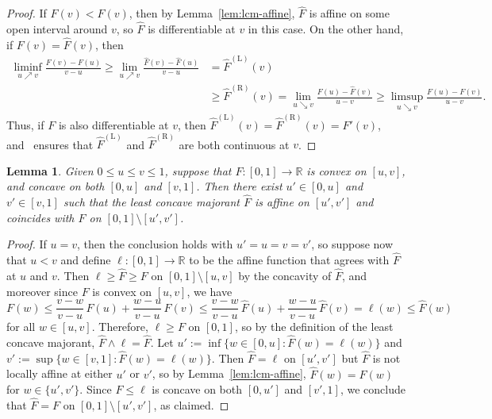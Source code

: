 \documentclass[a4paper]{article}
\newcommand{\R}{\mathbb{R}}
\newtheorem{lemma}[theorem]{Lemma}
\theoremstyle{definition}
\begin{document}
\begin{proof}
If $F(v) < \hat{F}(v)$, then by Lemma~\ref{lem:lcm-affine}, $\hat{F}$ is affine on some open interval around $v$, so $\hat{F}$ is differentiable at $v$ in this case. On the other hand, if $F(v) = \hat{F}(v)$, then
\begin{align*}
\liminf_{u \nearrow v}\frac{F(v) - F(u)}{v - u} \geq \lim_{u \nearrow v}\frac{\hat{F}(v) - \hat{F}(u)}{v - u} &= \hat{F}^{(\mathrm{L})}(v) \\
&\geq \hat{F}^{(\mathrm{R})}(v) = \lim_{u \searrow v}\frac{\hat{F}(u) - \hat{F}(v)}{u - v} \geq \limsup_{u \searrow v}\frac{F(u) - F(v)}{u - v}.
\end{align*}
Thus, if $F$ is also differentiable at $v$, then $\hat{F}^{(\mathrm{L})}(v) = \hat{F}^{(\mathrm{R})}(v) = F'(v)$, and~\citet[Theorem~24.1]{rockafellar97convex} ensures that $\hat{F}^{(\mathrm{L})}$ and $\hat{F}^{(\mathrm{R})}$ are both continuous at $v$.
\end{proof}

\begin{lemma}
\label{lem:lcm-concave-cvx}
Given $0 \leq u \leq v \leq 1$, suppose that $F \colon [0,1] \to \R$ is convex on $[u,v]$, and concave on both $[0,u]$ and $[v,1]$. Then there exist $u' \in [0,u]$ and $v' \in [v,1]$ such that the least concave majorant $\hat{F}$ is affine on $[u',v']$ and coincides with $F$ on $[0,1] \setminus [u',v']$.
\end{lemma}

\begin{proof}
If $u = v$, then the conclusion holds with $u' = u = v = v'$, so suppose now that $u < v$ and define $\ell \colon [0,1] \to \R$ to be the affine function that agrees with $\hat{F}$ at $u$ and $v$. Then 
$\ell \geq \hat{F} \geq F$ on $[0,1] \setminus [u,v]$ by the concavity of $\hat{F}$, and moreover since $F$ is convex on $[u,v]$, we have
\[
F(w) \leq \frac{v - w}{v - u}\,F(u) + \frac{w - u}{v - u}\,F(v) \leq \frac{v - w}{v - u}\,\hat{F}(u) + \frac{w - u}{v - u}\,\hat{F}(v) = \ell(w) \leq \hat{F}(w)
\]
for all $w \in [u,v]$. Therefore, $\ell \geq F$ on $[0,1]$, so by the definition of the least concave majorant, $\hat{F} \wedge \ell = \hat{F}$. Let $u' := \inf\{w \in [0,u] : \hat{F}(w) = \ell(w)\}$ and $v' := \sup\{w \in [v,1] : \hat{F}(w) = \ell(w)\}$. Then $\hat{F} = \ell$ on $[u',v']$ but $\hat{F}$ is not locally affine at either $u'$ or $v'$, so by Lemma~\ref{lem:lcm-affine}, $\hat{F}(w) = F(w)$ for $w \in \{u',v'\}$. Since $F \leq \ell$ is concave on both $[0,u']$ and $[v',1]$, we conclude that $\hat{F} = F$ on $[0,1] \setminus [u',v']$, as claimed.
\end{proof}
\end{document}
